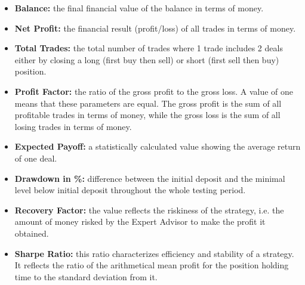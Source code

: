 \begin{itemize}
\setlength\itemsep{0.3em}
\item \textbf{Balance:} the final financial value of the balance in terms of money.
\item \textbf{Net Profit:} the financial result (profit/loss) of all trades in terms of money.
\item \textbf{Total Trades:} the total number of trades where 1 trade includes 2 deals either by closing a long (first buy then sell) or short (first sell then buy) position.
\item \textbf{Profit Factor:} the ratio of the gross profit to the gross loss. A value of one means that these parameters are equal. The gross profit is the sum of all profitable trades in terms of money, while the gross loss is the sum of all losing trades in terms of money.
\item \textbf{Expected Payoff:} a statistically calculated value showing the average return of one deal. 
\item \textbf{Drawdown in \%:} difference between the initial deposit and the minimal level below initial deposit throughout the whole testing period.
\item \textbf{Recovery Factor:} the value reflects the riskiness of the strategy, i.e. the amount of money risked by the Expert Advisor to make the profit it obtained.
\item \textbf{Sharpe Ratio:} this ratio characterizes efficiency and stability of a strategy. It reflects the ratio of the arithmetical mean profit for the position holding time to the standard deviation from it.
\end{itemize}

